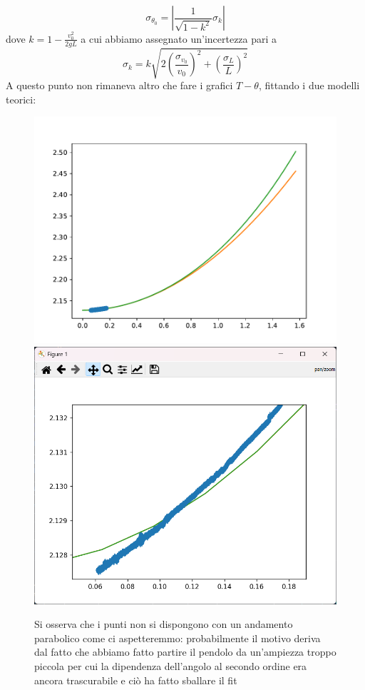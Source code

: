 \documentclass{article}
\begin{document}
$$
	\sigma_{\theta_0} = \left| {\frac{1}{\sqrt{1-k^2}}\sigma_k} \right|
$$
\clearpage
\noindent dove $k = 1-\frac{v_0^2}{2gL}$ a cui abbiamo assegnato un'incertezza pari a
$$	
	\sigma_k = k \sqrt{ 2 \left(\frac{\sigma_{v_0}}{v_0} \right)^2 + \left(\frac{\sigma_L}{L} \right)^2}
$$
A questo punto non rimaneva altro che fare i grafici $T-\theta$, fittando i due modelli teorici:
\begin{figure}
	\centering
	\includegraphics[scale=0.60]{Fit_piccola_ampiezza.pdf} \\
	\includegraphics[scale=0.50]{zoom_piccole_ampiezze.png}
	\caption{Si osserva che i punti non si dispongono con un andamento parabolico come ci aspetteremmo: probabilmente il motivo deriva dal fatto che abbiamo fatto partire il pendolo da un'ampiezza troppo piccola per cui la dipendenza dell'angolo al secondo ordine era ancora trascurabile e ciò ha fatto sballare il fit}
\end{figure}
\end{document}
